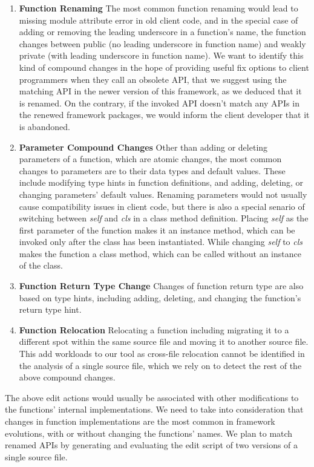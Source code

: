 \begin{enumerate}
  \item \textbf{Function Renaming}
  The most common function renaming would lead to missing module attribute error in old client code, and in the special case of adding or removing the leading underscore in a function's name, the function changes between public (no leading underscore in function name) and weakly private (with leading underscore in function name). We want to identify this kind of compound changes in the hope of providing useful fix options to client programmers when they call an obsolete API, that we suggest using the matching API in the newer version of this framework, as we deduced that it is renamed. On the contrary, if the invoked API doesn't match any APIs in the renewed framework packages, we would inform the client developer that it is abandoned.

  \item \textbf{Parameter Compound Changes}
  Other than adding or deleting parameters of a function, which are atomic changes, the most common changes to parameters are to their data types and default values. These include modifying type hints in function definitions, and adding, deleting, or changing parameters' default values. Renaming parameters would not usually cause compatibility issues in client code, but there is also a special senario of switching between \textit{self} and \textit{cls} in a class method definition. Placing \textit{self} as the first parameter of the function makes it an instance method, which can  be invoked only after the class has been instantiated. While changing \textit{self} to \textit{cls} makes the function a class method, which can be called without an instance of the class.

  \item \textbf{Function Return Type Change}
  Changes of function return type are also based on type hints, including adding, deleting, and changing the function's return type hint.

  \item \textbf{Function Relocation}
  Relocating a function including migrating it to a different spot within the same source file and moving it to another source file. This add workloads to our tool as cross-file relocation cannot be identified in the analysis of a single source file, which we rely on to detect the rest of the above compound changes.

\end{enumerate}

The above edit actions would usually be associated with other modifications to the functions' internal implementations. We need to take into consideration that changes in function implementations are the most common in framework evolutions, with or without changing the functions' names. We plan to match renamed APIs by generating and evaluating the edit script of two versions of a single source file.
